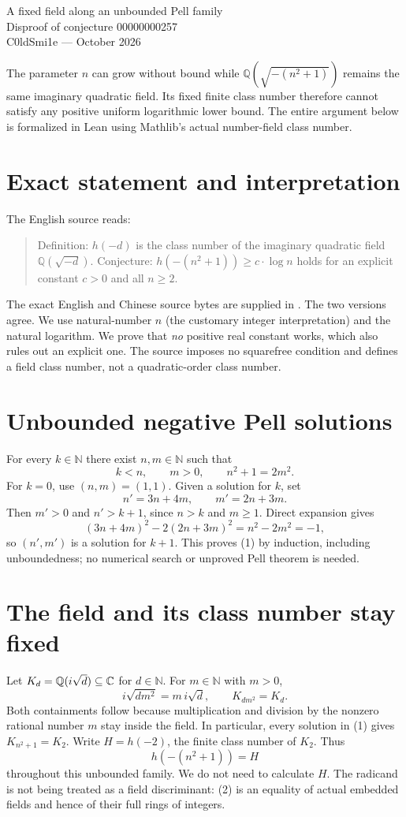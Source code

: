 \documentclass[10pt]{article}
\newcommand{\lean}[1]{\texttt{\detokenize{#1}}}
\newcommand{\Q}{\mathbb{Q}}\newcommand{\N}{\mathbb{N}}
\begin{document}
\begin{center}
{\LARGE A fixed field along an unbounded Pell family}\\[5pt]
{\large Disproof of conjecture 00000000257}\\[5pt]
C0ldSmi1e \quad ---  October 2026
\end{center}

The parameter $n$ can grow without bound while
$\Q(\sqrt{-(n^2+1)})$ remains the same imaginary quadratic field.
Its fixed finite class number therefore cannot satisfy any positive
uniform logarithmic lower bound. The entire argument below is formalized
in Lean using Mathlib's actual number-field class number.

\section{Exact statement and interpretation}
The English source reads:
\begin{quote}\small
Definition: $h(-d)$ is the class number of the imaginary quadratic field
$\Q(\sqrt{-d})$. Conjecture: $h(-(n^2+1))\geq c\cdot\log n$ holds for an explicit constant
$c>0$ and all $n\geq2$.
\end{quote}
The exact English and Chinese source bytes are supplied in
\lean{conjecture.md}. The two versions agree. We use natural-number $n$
(the customary integer interpretation) and the natural logarithm. We prove
that \emph{no} positive real constant works, which also rules out an explicit
one. The source imposes no squarefree condition and defines a field class
number, not a quadratic-order class number.

\section{Unbounded negative Pell solutions}
For every $k\in\N$ there exist $n,m\in\N$ such that
\[
 k<n,\qquad m>0,\qquad n^2+1=2m^2.                 \tag{1}
\]
For $k=0$, use $(n,m)=(1,1)$. Given a solution for $k$, set
\[
 n'=3n+4m,\qquad m'=2n+3m.
\]
Then $m'>0$ and $n'>k+1$, since $n>k$ and $m\geq1$. Direct expansion gives
\[
 (3n+4m)^2-2(2n+3m)^2=n^2-2m^2=-1,
\]
so $(n',m')$ is a solution for $k+1$. This proves (1) by induction, including
unboundedness; no numerical search or unproved Pell theorem is needed.

\section{The field and its class number stay fixed}
Let $K_d=\Q(i\sqrt d)\subseteq\C$ for $d\in\N$. For $m\in\N$ with $m>0$,
\[
 i\sqrt{dm^2}=m\,i\sqrt d,\qquad K_{dm^2}=K_d.    \tag{2}
\]
Both containments follow because multiplication and division by the nonzero
rational number $m$ stay inside the field. In particular, every solution in
(1) gives $K_{n^2+1}=K_2$. Write $H=h(-2)$, the finite class number of $K_2$.
Thus
\[
 h(-(n^2+1))=H                                    \tag{3}
\]
throughout this unbounded family. We do not need to calculate $H$.
The radicand is not being treated as a field discriminant: (2) is an equality
of actual embedded fields and hence of their full rings of integers.
\end{document}

